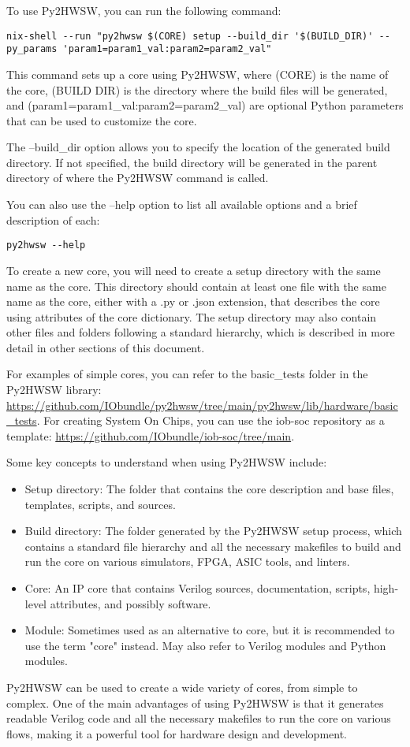 %

To use Py2HWSW, you can run the following command:
\begin{verbatim}
nix-shell --run "py2hwsw $(CORE) setup --build_dir '$(BUILD_DIR)' --py_params 'param1=param1_val:param2=param2_val"
\end{verbatim}
This command sets up a core using Py2HWSW, where (CORE) is the name of the core, (BUILD DIR) is the directory where the build files will be generated, and (param1=param1_val:param2=param2_val) are optional Python parameters that can be used to customize the core.

The --build_dir option allows you to specify the location of the generated build directory. If not specified, the build directory will be generated in the parent directory of where the Py2HWSW command is called.

You can also use the --help option to list all available options and a brief description of each:
\begin{verbatim}
py2hwsw --help
\end{verbatim}

To create a new core, you will need to create a setup directory with the same name as the core. This directory should contain at least one file with the same name as the core, either with a .py or .json extension, that describes the core using attributes of the core dictionary. The setup directory may also contain other files and folders following a standard hierarchy, which is described in more detail in other sections of this document.

For examples of simple cores, you can refer to the basic_tests folder in the Py2HWSW library: \url{https://github.com/IObundle/py2hwsw/tree/main/py2hwsw/lib/hardware/basic_tests}. For creating System On Chips, you can use the iob-soc repository as a template: \url{https://github.com/IObundle/iob-soc/tree/main}.

Some key concepts to understand when using Py2HWSW include:

\begin{itemize}
  \item Setup directory: The folder that contains the core description and base files, templates, scripts, and sources.
  \item Build directory: The folder generated by the Py2HWSW setup process, which contains a standard file hierarchy and all the necessary makefiles to build and run the core on various simulators, FPGA, ASIC tools, and linters.
  \item Core: An IP core that contains Verilog sources, documentation, scripts, high-level attributes, and possibly software.
  \item Module: Sometimes used as an alternative to core, but it is recommended to use the term "core" instead. May also refer to Verilog modules and Python modules.
\end{itemize}

Py2HWSW can be used to create a wide variety of cores, from simple to complex. One of the main advantages of using Py2HWSW is that it generates readable Verilog code and all the necessary makefiles to run the core on various flows, making it a powerful tool for hardware design and development.
